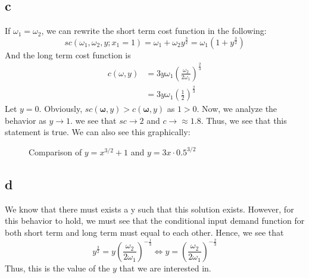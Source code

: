 \documentclass[11pt]{article}
\begin{document}
\subsection*{c}
If $\omega_1 = \omega_2$, we can rewrite the short term cost function in the following:
\[
    sc(\omega_1, \omega_2, y; x_1 = 1) = \omega_1 + \omega_2 y^\frac{3}{2} = \omega_1(1 + y^\frac{3}{2})
\]
And the long term cost function is
\begin{align*}
    c(\omega, y) &= 3y \omega_1 \left( \frac{\omega_2}{2\omega_1} \right)^\frac{2}{3}\\
    &= 3y \omega_1 \left( \frac{1}{2} \right)^\frac{2}{3}
\end{align*}
Let $y = 0$. Obviously, $sc(\mathbf{\omega}, y) > c(\mathbf{\omega}, y)$ as $1 > 0$. Now, we analyze the behavior as $y \to 1$. we see that $sc \to 2$ and $c \to \approx 1.8$. Thus, we see that this statement is true. We can also see this graphically:
\begin{figure}[H]
    \centering
    \caption{Comparison of $y = x^{3/2} + 1$ and $y = 3x \cdot 0.5^{3/2}$}
    \label{fig:comparison}
\end{figure}
\subsection*{d}
We know that there must exists a y such that this solution exists. However, for this behavior to hold, we must see that the conditional input demand function for both short term and long term must equal to each other. Hence, we see that 
\[
y^\frac{3}{2} = y \left( \frac{\omega_2}{2\omega_1} \right)^{-\frac{1}{3}} \iff y = \left( \frac{\omega_2}{2\omega_1} \right)^{-\frac{2}{3}}
\]
Thus, this is the value of the $y$ that we are interested in. 
\end{document}
